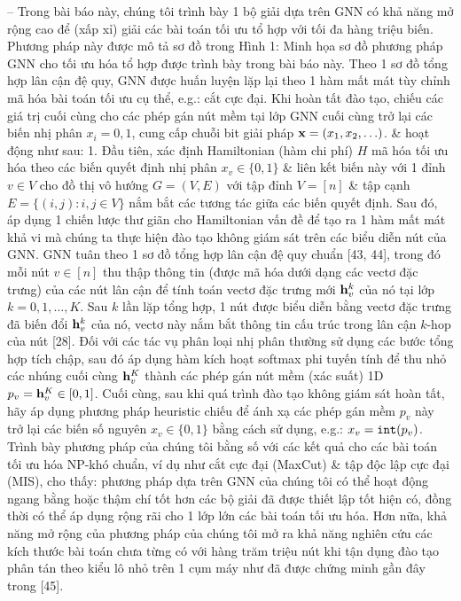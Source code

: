 \documentclass{article}
\begin{document}
\begin{itemize}
    -- Trong bài báo này, chúng tôi trình bày 1 bộ giải dựa trên GNN có khả năng mở rộng cao để (xấp xỉ) giải các bài toán tối ưu tổ hợp với tối đa hàng triệu biến. Phương pháp này được mô tả sơ đồ trong {\sf Hình 1: Minh họa sơ đồ phương pháp GNN cho tối ưu hóa tổ hợp được trình bày trong bài báo này. Theo 1 sơ đồ tổng hợp lân cận đệ quy, GNN được huấn luyện lặp lại theo 1 hàm mất mát tùy chỉnh mã hóa bài toán tối ưu cụ thể, e.g.: cắt cực đại. Khi hoàn tất đào tạo, chiếu các giá trị cuối cùng cho các phép gán nút mềm tại lớp GNN cuối cùng trở lại các biến nhị phân $x_i = 0,1$, cung cấp chuỗi bit giải pháp ${\bf x} = (x_1,x_2,\ldots)$.} \& hoạt động như sau: 1. Đầu tiên, xác định Hamiltonian (hàm chi phí) $H$ mã hóa tối ưu hóa theo các biến quyết định nhị phân $x_v\in\{0,1\}$ \& liên kết biến này với 1 đỉnh $v\in V$ cho đồ thị vô hướng $G = (V,E)$ với tập đỉnh $V = [n]$ \& tập cạnh $E = \{(i,j):i,j\in V\}$ nắm bắt các tương tác giữa các biến quyết định. Sau đó, áp dụng 1 chiến lược thư giãn cho Hamiltonian vấn đề để tạo ra 1 hàm mất mát khả vi mà chúng ta thực hiện đào tạo không giám sát trên các biểu diễn nút của GNN. GNN tuân theo 1 sơ đồ tổng hợp lân cận đệ quy chuẩn [43, 44], trong đó mỗi nút $v\in[n]$ thu thập thông tin (được mã hóa dưới dạng các vectơ đặc trưng) của các nút lân cận để tính toán vectơ đặc trưng mới ${\bf h}_v^k$ của nó tại lớp $k = 0,1,\ldots,K$. Sau $k$ lần lặp tổng hợp, 1 nút được biểu diễn bằng vectơ đặc trưng đã biến đổi ${\bf h}_v^k$ của nó, vectơ này nắm bắt thông tin cấu trúc trong lân cận $k$-hop của nút [28]. Đối với các tác vụ phân loại nhị phân thường sử dụng các bước tổng hợp tích chập, sau đó áp dụng hàm kích hoạt softmax phi tuyến tính để thu nhỏ các nhúng cuối cùng ${\bf h}_v^K$ thành các phép gán nút mềm (xác suất) 1D $p_v = {\bf h}_v^K\in[0,1]$. Cuối cùng, sau khi quá trình đào tạo không giám sát hoàn tất, hãy áp dụng phương pháp heuristic chiếu để ánh xạ các phép gán mềm $p_v$ này trở lại các biến số nguyên $x_v\in\{0,1\}$ bằng cách sử dụng, e.g.: $x_v = {\tt int}(p_v)$. Trình bày phương pháp của chúng tôi bằng số với các kết quả cho các bài toán tối ưu hóa NP-khó chuẩn, ví dụ như cắt cực đại (MaxCut) \& tập độc lập cực đại (MIS), cho thấy: phương pháp dựa trên GNN của chúng tôi có thể hoạt động ngang bằng hoặc thậm chí tốt hơn các bộ giải đã được thiết lập tốt hiện có, đồng thời có thể áp dụng rộng rãi cho 1 lớp lớn các bài toán tối ưu hóa. Hơn nữa, khả năng mở rộng của phương pháp của chúng tôi mở ra khả năng nghiên cứu các kích thước bài toán chưa từng có với hàng trăm triệu nút khi tận dụng đào tạo phân tán theo kiểu lô nhỏ trên 1 cụm máy như đã được chứng minh gần đây trong [45].


\end{itemize}
\end{document}
